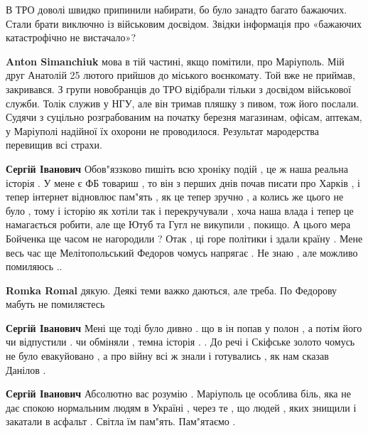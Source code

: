  
 
 
 
 

\qqSecCmt


В ТРО доволі швидко припинили набирати, бо було занадто багато бажаючих. Стали
брати виключно із військовим досвідом. Звідки інформація про «бажаючих
катастрофічно не вистачало»?

\begin{itemize} %
\textbf{Anton Simanchiuk} мова в тій частині, якщо помітили, про Маріуполь. Мій друг Анатолій 25 лютого прийшов до міського воєнкомату. Той вже не приймав, закривався. З групи новобранців до ТРО відібрали тільки з досвідом військової служби. Толік служив у НГУ, але він тримав пляшку з пивом, тож його послали.
Судячи з суцільно розграбованим на початку березня магазинам, офісам, аптекам, у Маріуполі надійної їх охорони не проводилося. Результат мародерства перевищив всі страхи.

\textbf{Сергій Іванович} Обов"яззково пишіть всю хроніку подій , це ж наша реальна історія . У мене є ФБ товариш , то він з перших днів почав писати про Харків , і тепер інтернет відновлює пам"ять , як це тепер зручно , а колись же цього не було , тому і історію як хотіли так і перекручували , хоча наша влада і тепер це намагається робити, але ще Ютуб та Гугл не викупили , покищо. А цього мера Бойченка ще часом не нагородили ? Отак , ці горе політики і здали країну . Мене весь час ще Мелітопольський Федоров чомусь напрягає . Не знаю , але можливо помиляюсь ..

\textbf{Romka Romal} дякую. Деякі теми важко даються, але треба. По Федорову мабуть не помиляєтесь

\textbf{Сергій Іванович} Мені ще тоді було дивно . що в ін попав у полон , а потім його чи відпустили . чи обміняли , темна історія . . До речі і Скіфське золото чомусь не було евакуйовано , а про війну всі ж знали і готувались , як нам сказав Данілов .

\textbf{Сергій Іванович} Абсолютно вас розумію . Маріуполь це особлива біль, яка не дає спокою нормальним людям в Україні , через те , що людей , яких знищили і закатали в асфальт . Світла їм пам"ять. Пам"ятаємо .


\end{itemize}
